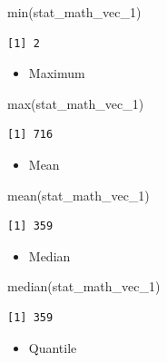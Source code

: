 \documentclass[
  letterpaper,
  DIV=11,
  numbers=noendperiod]{scrreprt}
\newenvironment{Shaded}{\begin{snugshade}}{\end{snugshade}}
\newcommand{\FunctionTok}[1]{\textcolor[rgb]{0.28,0.35,0.67}{#1}}
\newcommand{\NormalTok}[1]{\textcolor[rgb]{0.00,0.23,0.31}{#1}}
\providecommand{\tightlist}{%
  \setlength{\itemsep}{0pt}\setlength{\parskip}{0pt}}\usepackage{longtable,booktabs,array}
\begin{document}
\begin{Shaded}
\begin{Highlighting}[]
\FunctionTok{min}\NormalTok{(stat\_math\_vec\_1)}
\end{Highlighting}
\end{Shaded}

\begin{verbatim}
[1] 2
\end{verbatim}

\begin{itemize}
\tightlist
\item
  Maximum
\end{itemize}

\begin{Shaded}
\begin{Highlighting}[]
\FunctionTok{max}\NormalTok{(stat\_math\_vec\_1)}
\end{Highlighting}
\end{Shaded}

\begin{verbatim}
[1] 716
\end{verbatim}

\begin{itemize}
\tightlist
\item
  Mean
\end{itemize}

\begin{Shaded}
\begin{Highlighting}[]
\FunctionTok{mean}\NormalTok{(stat\_math\_vec\_1)}
\end{Highlighting}
\end{Shaded}

\begin{verbatim}
[1] 359
\end{verbatim}

\begin{itemize}
\tightlist
\item
  Median
\end{itemize}

\begin{Shaded}
\begin{Highlighting}[]
\FunctionTok{median}\NormalTok{(stat\_math\_vec\_1)}
\end{Highlighting}
\end{Shaded}

\begin{verbatim}
[1] 359
\end{verbatim}

\begin{itemize}
\tightlist
\item
  Quantile
\end{itemize}
\end{document}
